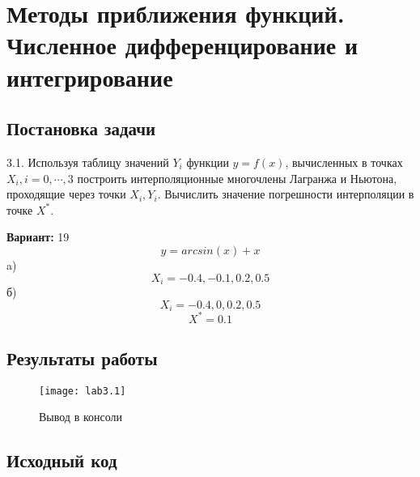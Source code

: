 \section{Методы приближения функций. Численное дифференцирование и интегрирование}

\subsection{Постановка задачи}
3.1. Используя таблицу значений $Y_i$ функции $y=f(x)$, вычисленных в точках $X_i, i=0,\cdots,3$ построить интерполяционные многочлены Лагранжа и Ньютона, проходящие через точки ${X_i, Y_i}$.  Вычислить значение погрешности интерполяции в точке $X^*$.

{\bfseries Вариант:} 19
    \begin{equation}
        y = arcsin(x) + x
    \end{equation}
    a)
    \begin{equation}
        X_i = -0.4, -0.1, 0.2, 0.5
    \end{equation}
    б)
    \begin{equation}
        X_i = -0.4, 0, 0.2, 0.5
    \end{equation}
    \begin{equation}
        X^* = 0.1
    \end{equation}
\pagebreak

\subsection{Результаты работы}
\begin{figure}[h!]
\centering
\texttt{[image: lab3.1]}
\caption{Вывод в консоли}
\end{figure}


\subsection{Исходный код}

\pagebreak

